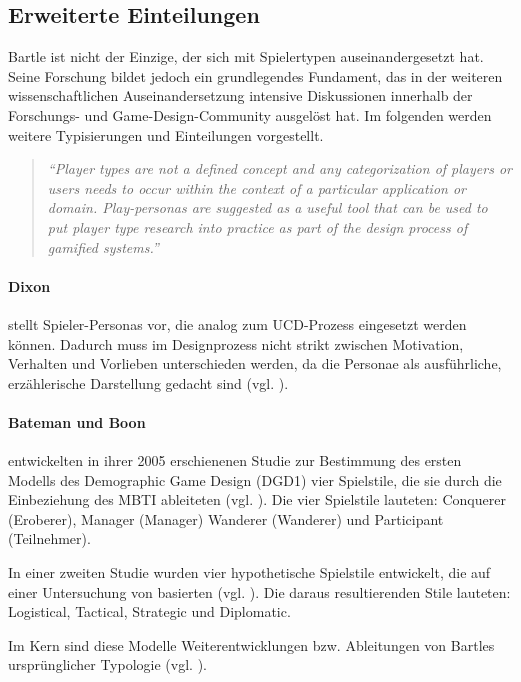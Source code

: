 \subsection{Erweiterte Einteilungen}
Bartle ist nicht der Einzige, der sich mit Spielertypen auseinandergesetzt hat. Seine Forschung bildet jedoch ein grundlegendes Fundament, das in der weiteren wissenschaftlichen Auseinandersetzung intensive Diskussionen innerhalb der Forschungs- und Game-Design-Community ausgelöst hat. Im folgenden werden weitere Typisierungen und Einteilungen vorgestellt.
\begin{quote}
    \textit{
        \enquote{Player types are not a defined concept and any categorization of players or users needs to occur within the context of a particular application or domain. Play-personas are suggested as a useful tool that can be used to put player type research into practice as part of the design process of gamified systems.}
    } 
    \cite{dixon_player_nodate}
\end{quote}

\paragraph{Dixon} 
stellt Spieler-Personas vor, die analog zum \ac{UCD}-Prozess eingesetzt werden können. Dadurch muss im Designprozess nicht strikt zwischen Motivation, Verhalten und Vorlieben unterschieden werden, da die Personae als ausführliche, erzählerische Darstellung gedacht sind (vgl. \citealp{dixon_player_nodate}).

\paragraph{Bateman und Boon}
entwickelten in ihrer 2005 erschienenen Studie zur Bestimmung des ersten Modells des Demographic Game Design (DGD1) vier Spielstile, die sie durch die Einbeziehung des \ac{MBTI} ableiteten (vgl. \citealp{noauthor_mbti_nodate, bateman_21st_2005}).
Die vier Spielstile lauteten: Conquerer (Eroberer), Manager (Manager) Wanderer (Wanderer) und Participant (Teilnehmer).

In einer zweiten Studie wurden vier hypothetische Spielstile entwickelt, die auf einer Untersuchung von \cite{berens_understanding_2000} basierten (vgl. \citealp{bateman_player_2012}). Die daraus resultierenden Stile lauteten: Logistical, Tactical, Strategic und Diplomatic.

Im Kern sind diese Modelle Weiterentwicklungen bzw. Ableitungen von Bartles ursprünglicher Typologie (vgl. \citealp{institut_fur_ludologie_spielertypen_nodate}).

